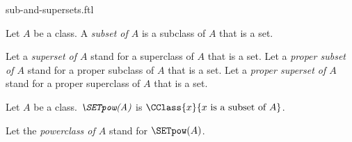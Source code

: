 \documentclass{stex}
\begin{document}
\begin{smodule}{sub-and-supersets.ftl}

\begin{definition}[forthel,id=FOUNDATIONS_10_1346889551183872]
  Let $A$ be a class.
  A \emph{subset of $A$} is a subclass of $A$ that is a set.

  Let a \emph{superset of $A$} stand for a superclass of $A$ that is a set.
  Let a \emph{proper subset of $A$} stand for a proper subclass of $A$ that is a set.
  Let a \emph{proper superset of $A$} stand for a proper superclass of $A$ that is a set.
\end{definition}

\begin{definition}[forthel,id=FOUNDATIONS_10_1448589907722240]
  Let $A$ be a class.
  $\emph{\SETpow(A)}$ is $\CClass{x}{x\text{ is a subset of }A}$.

  Let the \emph{powerclass of $A$} stand for $\SETpow(A)$.
\end{definition}
\end{smodule}
\end{document}
